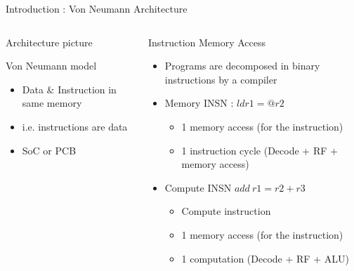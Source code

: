 %
\begin{Frame}{Introduction : Von Neumann Architecture}
  \begin{columns}[t]
    \begin{column}{\BW} %
      \begin{block}{Architecture picture}
      \end{block}   
      \begin{block}{Von Neumann model}
        \begin{itemize}
        \item Data \& Instruction in same memory
        \item i.e. instructions are data
        \item SoC or PCB
        \end{itemize}
      \end{block} 
    \end{column}
    \begin{column}{\BW} %
      \begin{alertblock}{Instruction Memory Access}
        \begin{itemize}
        \item Programs are decomposed in binary instructions by a compiler
        \item {Memory INSN : $ld r1 = @r2$}
          \begin{itemize}
          \item 1 memory access (for the instruction)
          \item 1 instruction cycle (Decode + RF + memory access)
          \end{itemize}
          
        \item {Compute INSN $add\ r1 =  r2 + r3 $}
          \begin{itemize}
          \item Compute instruction 
          \item 1 memory access (for the instruction)
          \item 1 computation (Decode + RF + ALU)
          \end{itemize}
        \end{itemize}
      \end{alertblock}
    \end{column}
    
  \end{columns}  
\end{Frame}


